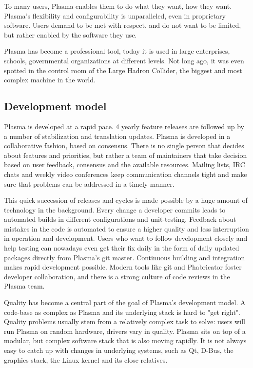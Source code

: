To many users, Plasma enables them to do what they want, how they want. Plasma's flexibility and configurability is unparalleled, even in proprietary software. Users demand to be met with respect, and do not want to be limited, but rather enabled by the software they use.

Plasma has become a professional tool, today it is used in large enterprises, schools, governmental organizations at different levels. Not long ago, it was even spotted in the control room of the Large Hadron Collider, the biggest and most complex machine in the world.

\subsection*{Development model}

Plasma is developed at a rapid pace. 4 yearly feature releases are followed up by a number of stabilization and translation updates.
Plasma is developed in a collaborative fashion, based on consensus. There is no single person that decides about features and priorities, but rather a team of maintainers that take decision based on user feedback, consensus and the available resources. Mailing lists, IRC chats and weekly video conferences keep communication channels tight and make sure that problems can be addressed in a timely manner.

This quick succession of releases and cycles is made possible by a huge amount of technology in the background. Every change a developer commits leads to automated builds in different configurations and unit-testing. Feedback about mistakes in the code is automated to ensure a higher quality and less interruption in operation and development. Users who want to follow development closely and help testing can nowadays even get their fix daily in the form of daily updated packages directly from Plasma's git master. Continuous building and integration makes rapid development possible.
Modern tools like git and Phabricator foster developer collaboration, and there is a strong culture of code reviews in the Plasma team.

Quality has become a central part of the goal of Plasma's development model. A code-base as complex as Plasma and its underlying stack is hard to "get right". Quality problems usually stem from a relatively complex task to solve: users will run Plasma on random hardware, drivers vary in quality. Plasma sits on top of a modular, but complex software stack that is also moving rapidly. It is not always easy to catch up with changes in underlying systems, such as Qt, D-Bus, the graphics stack, the Linux kernel and its close relatives.

